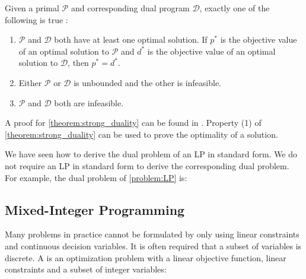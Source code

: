 \begin{theorem} \label{theorem:strong_duality}
    Given a primal $\mathcal{P}$ and corresponding dual program $\mathcal{D}$, exactly one of the following is true \cite{noauthor_numerical_2006}:
    \begin{enumerate}
        \item $\mathcal{P}$ and $\mathcal{D}$ both have at least one optimal solution. If $p^*$ is the objective value of an optimal solution to $\mathcal{P}$ and $d^*$ is the objective value of an optimal solution to $\mathcal{D}$, then $p^*=d^*$.
        \item Either $\mathcal{P}$ or $\mathcal{D}$ is unbounded and the other is infeasible. 
        \item $\mathcal{P}$ and $\mathcal{D}$ both are infeasible.
    \end{enumerate}
\end{theorem}
A proof for \cref{theorem:strong_duality} can be found in \cite{aps_mosek_nodate}. Property (1) of \cref{theorem:strong_duality} can be used to prove the optimality of a solution. 

We have seen how to derive the dual problem of an LP in standard form. We do not require an LP in standard form to derive the corresponding dual problem. For example, the dual problem of \cref{problem:LP} is: 



\subsection{Mixed-Integer Programming} \label{section:MIP}
Many problems in practice cannot be formulated by only using linear constraints and continuous decision variables. It is often required that a subset of variables is discrete. A  is an optimization problem with a linear objective function, linear constraints and a subset of integer variables:

